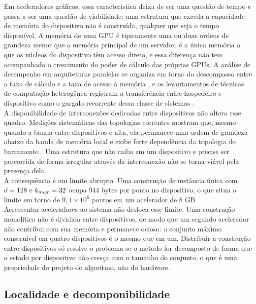 Em aceleradores gráficos, essa característica deixa de ser uma questão de tempo e passa a ser uma questão de viabilidade: uma estrutura que exceda a capacidade de memória do dispositivo não é construída, qualquer que seja o tempo disponível. A memória de uma \ac{GPU} é tipicamente uma ou duas ordens de grandeza menor que a memória principal de um servidor, é a única memória a que os núcleos do dispositivo têm acesso direto, e essa diferença não tem acompanhado o crescimento do poder de cálculo das próprias \ac{GPU}s. A análise de desempenho em arquiteturas paralelas se organiza em torno do descompasso entre a taxa de cálculo e a taxa de acesso à memória \cite{roofline}, e os levantamentos de técnicas de computação heterogênea registram a transferência entre hospedeiro e dispositivo como o gargalo recorrente dessa classe de sistemas \cite{cpu-gpu-survey}.\\

A disponibilidade de interconexões dedicadas entre dispositivos não altera esse quadro. Medições sistemáticas das topologias correntes mostram que, mesmo quando a banda entre dispositivos é alta, ela permanece uma ordem de grandeza abaixo da banda de memória local e exibe forte dependência da topologia do barramento \cite{gpu-interconnect}. Uma estrutura que não caiba em um dispositivo e precise ser percorrida de forma irregular através da interconexão não se torna viável pela presença dela.\\

A consequência é um limite abrupto. Uma construção de instância única com $d = 128$ e $k_{max} = 32$ ocupa 944 bytes por ponto no dispositivo, o que situa o limite em torno de $9{,}1 \times 10^6$ pontos em um acelerador de 8 GB.\\

Acrescentar aceleradores ao sistema não desloca esse limite. Uma construção monolítica não é dividida entre dispositivos, de modo que um segundo acelerador não contribui com sua memória e permanece ocioso: o conjunto máximo construível em quatro dispositivos é o mesmo que em um. Distribuir a construção entre dispositivos só resolve o problema se o método for decomposto de forma que o estado por dispositivo não cresça com o tamanho do conjunto, o que é uma propriedade do projeto do algoritmo, não do hardware.\\

\subsection{Localidade e decomponibilidade\label{sec:incremental-framework}}

